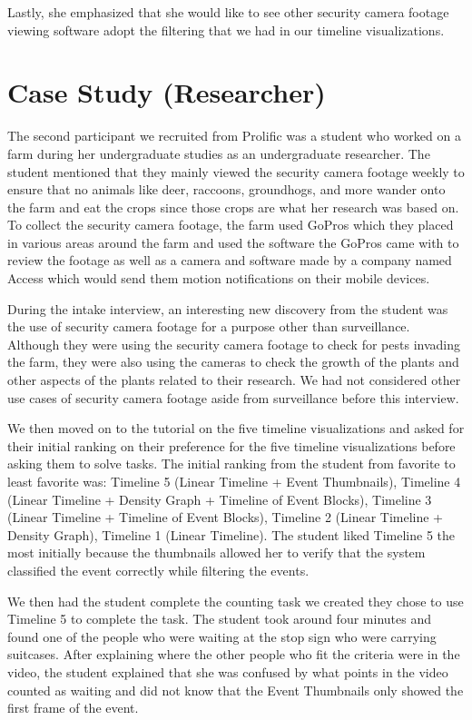 \documentclass[doublespace,draft,nopageskip]{VTthesis} %
\begin{document}
Lastly, she emphasized that she would like to see other security camera footage viewing software adopt the filtering that we had in our timeline visualizations.
\section{Case Study (Researcher)} \label{se:one_section}
The second participant we recruited from Prolific was a student who worked on a farm during her undergraduate studies as an undergraduate researcher. The student mentioned that they mainly viewed the security camera footage weekly to ensure that no animals like deer, raccoons, groundhogs, and more wander onto the farm and eat the crops since those crops are what her research was based on. To collect the security camera footage, the farm used GoPros which they placed in various areas around the farm and used the software the GoPros came with to review the footage as well as a camera and software made by a company named Access which would send them motion notifications on their mobile devices. 

During the intake interview, an interesting new discovery from the student was the use of security camera footage for a purpose other than surveillance. Although they were using the security camera footage to check for pests invading the farm, they were also using the cameras to check the growth of the plants and other aspects of the plants related to their research. We had not considered other use cases of security camera footage aside from surveillance before this interview.

We then moved on to the tutorial on the five timeline visualizations and asked for their initial ranking on their preference for the five timeline visualizations before asking them to solve tasks. The initial ranking from the student from favorite to least favorite was: Timeline 5 (Linear Timeline + Event Thumbnails), Timeline 4 (Linear Timeline + Density Graph + Timeline of Event Blocks), Timeline 3 (Linear Timeline + Timeline of Event Blocks), Timeline 2 (Linear Timeline + Density Graph), Timeline 1 (Linear Timeline). The student liked Timeline 5 the most initially because the thumbnails allowed her to verify that the system classified the event correctly while filtering the events. 

We then had the student complete the counting task we created they chose to use Timeline 5 to complete the task. The student took around four minutes and found one of the people who were waiting at the stop sign who were carrying suitcases. After explaining where the other people who fit the criteria were in the video, the student explained that she was confused by what points in the video counted as waiting and did not know that the Event Thumbnails only showed the first frame of the event.
\end{document}
